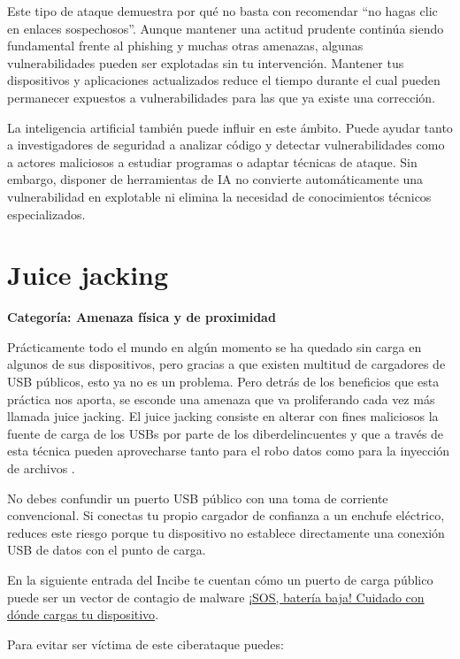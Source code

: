 \documentclass[
  spanish,
  a4paper,
  openany]{book}
\begin{document}
Este tipo de ataque demuestra por qué no basta con recomendar ``no hagas clic en enlaces sospechosos''. Aunque mantener una actitud prudente continúa siendo fundamental frente al phishing y muchas otras amenazas, algunas vulnerabilidades pueden ser explotadas sin tu intervención. Mantener tus dispositivos y aplicaciones actualizados reduce el tiempo durante el cual pueden permanecer expuestos a vulnerabilidades para las que ya existe una corrección.

La inteligencia artificial también puede influir en este ámbito. Puede ayudar tanto a investigadores de seguridad a analizar código y detectar vulnerabilidades como a actores maliciosos a estudiar programas o adaptar técnicas de ataque. Sin embargo, disponer de herramientas de IA no convierte automáticamente una vulnerabilidad en explotable ni elimina la necesidad de conocimientos técnicos especializados.

\section{Juice jacking}\label{juice-jacking}

\textbf{Categoría: Amenaza física y de proximidad}

Prácticamente todo el mundo en algún momento se ha quedado sin carga en algunos de sus dispositivos, pero gracias a que existen multitud de cargadores de USB públicos, esto ya no es un problema. Pero detrás de los beneficios que esta práctica nos aporta, se esconde una amenaza que va proliferando cada vez más llamada juice jacking. El juice jacking consiste en alterar con fines maliciosos la fuente de carga de los USBs por parte de los diberdelincuentes y que a través de esta técnica pueden aprovecharse tanto para el robo datos como para la inyección de archivos \citep{ESET-juice-jacking}.

No debes confundir un puerto USB público con una toma de corriente convencional. Si conectas tu propio cargador de confianza a un enchufe eléctrico, reduces este riesgo porque tu dispositivo no establece directamente una conexión USB de datos con el punto de carga.

En la siguiente entrada del Incibe te cuentan cómo un puerto de carga público puede ser un vector de contagio de malware \href{https://www.incibe.es/empresas/blog/sos-bateria-baja-cuidado-con-donde-cargas-tu-dispositivo}{¡SOS, batería baja! Cuidado con dónde cargas tu dispositivo}.

Para evitar ser víctima de este ciberataque puedes:
\end{document}
